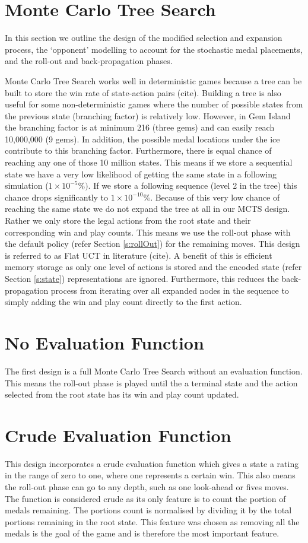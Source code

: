 \documentclass{bhamthesis}
\theoremstyle{definition}
\begin{document}
\section{Monte Carlo Tree Search}
In this section we outline the design of the modified selection and expansion process, the `opponent' modelling to account for the stochastic medal placements, and the roll-out and back-propagation phases.

Monte Carlo Tree Search works well in deterministic games because a tree can be built to store the win rate of state-action pairs (cite). Building a tree is also useful for some non-deterministic games where the number of possible states from the previous state (branching factor) is relatively low. However, in Gem Island the branching factor is at minimum 216 (three gems) and can easily reach 10,000,000 (9 gems). In addition, the possible medal locations under the ice contribute to this branching factor. Furthermore, there is equal chance of reaching any one of those 10 million states. This means if we store a sequential state we have a very low likelihood of getting the same state in a following simulation ($1 \times 10^{-5}\%)$. If we store a following sequence (level 2 in the tree) this chance drops significantly to $1 \times 10^{-10}\%$. Because of this very low chance of reaching the same state we do not expand the tree at all in our MCTS design. Rather we only store the legal actions from the root state and their corresponding win and play counts. This means we use the roll-out phase with the default policy (refer Section \ref{s:rollOut}) for the remaining moves. This design is referred to as Flat UCT in literature (cite). A benefit of this is efficient memory storage as only one level of actions is stored and the encoded state (refer Section \ref{s:state}) representations are ignored. Furthermore, this reduces the back-propagation process from iterating over all expanded nodes in the sequence to simply adding the win and play count directly to the first action.



\section{No Evaluation Function}
The first design is a full Monte Carlo Tree Search without an evaluation function. This means the roll-out phase is played until the a terminal state and the action selected from the root state has its win and play count updated.

\section{Crude Evaluation Function}
This design incorporates a crude evaluation function which gives a state a rating in the range of zero to one, where one represents a certain win. This also means the roll-out phase can go to any depth, such as one look-ahead or fives moves. The function is considered crude as its only feature is to count the portion of medals remaining. The portions count is normalised by dividing it by the total portions remaining in the root state. This feature was chosen as removing all the medals is the goal of the game and is therefore the most important feature.
\end{document}
